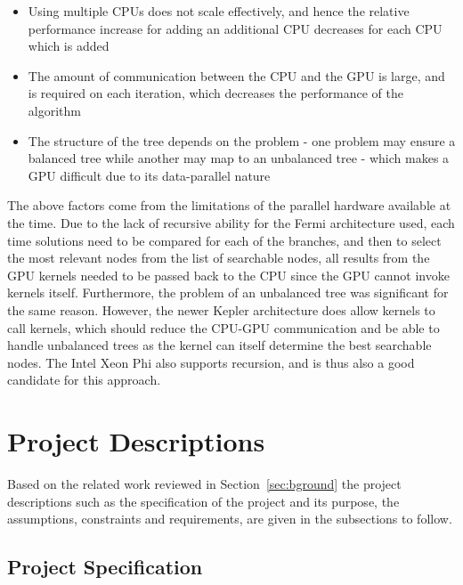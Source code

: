 \documentclass[10pt,twocolumn]{witseiepaper}
\begin{document}
\begin{itemize}
\item{ Using multiple CPUs does not scale effectively, and hence the relative performance increase for
    adding an additional CPU decreases for each CPU which is added
}
\item{ The amount of communication between the CPU and the GPU is large, and is required on each
        iteration, which decreases the performance of the algorithm
}
\item{ The structure of the tree depends on the problem - one problem may ensure a balanced tree while
        another may map to an unbalanced tree - which makes a GPU difficult due to its data-parallel
        nature
}
\end{itemize}

The above factors come from the limitations of the parallel hardware available at the time. Due to the lack of
recursive ability for the Fermi architecture used, each time solutions need to be compared for each of the
branches, and then to select the most relevant nodes from the list of searchable nodes, all results from the
GPU kernels needed to be passed back to the CPU since the GPU cannot invoke kernels itself. Furthermore, the 
problem of an unbalanced tree was significant for the same reason. However, the newer Kepler architecture does
allow kernels to call kernels, which should reduce the CPU-GPU communication and be able to handle unbalanced
trees as the kernel can itself determine the best searchable nodes. The Intel Xeon Phi also supports
recursion, and is thus also a good candidate for this approach.


\section{Project Descriptions} \label{sec:probspec}

Based on the related work reviewed in Section~\ref{sec:bground} the project descriptions such as the
specification of the project and its purpose, the assumptions, constraints and requirements, are given in the
subsections to follow.

\subsection{ Project Specification } \label{sec:projspec}
\end{document}
